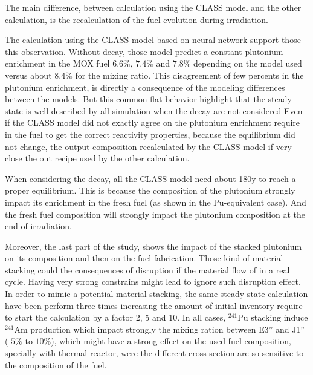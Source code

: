 \documentclass[10pt]{article}
\begin{document}
The main difference, between calculation using the CLASS model and the other
calculation, is the recalculation of the fuel evolution during irradiation. 

The calculation using the CLASS model based on neural network support those this
observation. Without decay, those model predict a constant plutonium enrichment
in the MOX fuel $6.6\%$, $7.4\%$ and $7.8\%$ depending on the model used versus
about $8.4\%$ for the mixing ratio. This disagreement of few percents in the
plutonium enrichment, is directly a consequence of the modeling differences
between the models.  But this common flat behavior highlight that the steady
state is well described by all simulation when the decay are not considered
Even if the CLASS model did not exactly agree on the plutonium enrichment
require in the fuel to get the correct reactivity properties, because the
equilibrium did not change, the output composition recalculated by the CLASS
model if very close the out recipe used by the other calculation.

When considering the decay, all the CLASS model need about 180y to reach a
proper equilibrium. This is because the composition of the plutonium
strongly impact its enrichment in the fresh fuel (as shown in the Pu-equivalent
case). And the fresh fuel composition will strongly impact the plutonium
composition at the end of irradiation. 

Moreover, the last part of the study, shows the impact of the stacked plutonium
on its composition and then on the fuel fabrication. Those kind of material
stacking could the consequences of disruption if the material flow of in a real
cycle. Having very strong constrains might lead to ignore such disruption
effect. In order to mimic a potential material stacking, the same steady state
calculation have been perform three times increasing the amount of initial
inventory require to start the calculation by a factor 2, 5 and 10. In all
cases, $^{241}$Pu stacking induce $^{241}$Am production which impact strongly
the mixing ration between E3'' and J1'' ( $5\%$ to $10\%$), which might have a
strong effect on the used fuel composition, specially with thermal reactor, were
the different cross section are so sensitive to the composition of the fuel.








\end{document}
